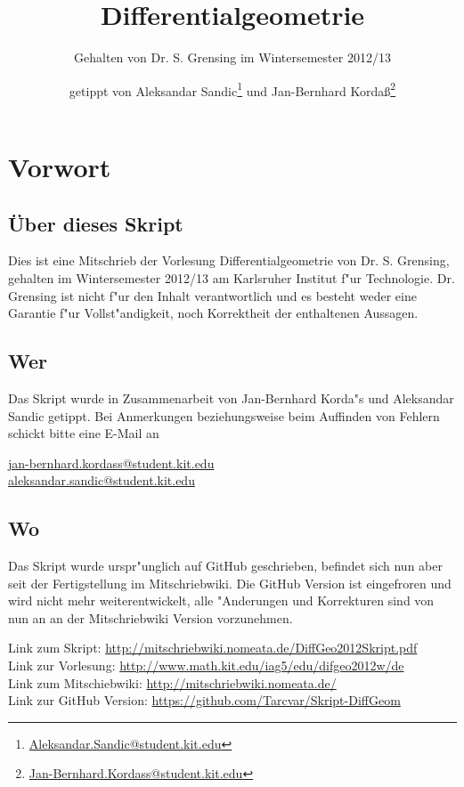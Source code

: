 \documentclass[paper=A4, twoside, chapterprefix=true, bibliography=totoc, headsepline]{scrbook}
\title{Differentialgeometrie}
\subtitle{Gehalten von Dr. S. Grensing im Wintersemester 2012/13}
\author{getippt von Aleksandar Sandic\thanks{\href{mailto:aleksandar.sandic@student.kit.edu}{Aleksandar.Sandic@student.kit.edu}} und Jan-Bernhard Korda\ss\thanks{\href{mailto:jan-bernhard.kordass@student.kit.edu}{Jan-Bernhard.Kordass@student.kit.edu}}}
\theoremstyle{plain}
\theoremstyle{nonumberplain}
\theoremstyle{empty}
\theoremstyle{break}
\newcommand{\quot}[1]{\textrm{\glqq}{#1}\textrm{\grqq}}
\begin{document}
\maketitle

\setlength\parskip{0.6pt}
\tableofcontents

\chapter*{Vorwort}

\section*{\"Uber dieses Skript}
Dies ist eine Mitschrieb der Vorlesung \quot{Differentialgeometrie} von Dr. S. Grensing, gehalten im Wintersemester 2012/13 am Karlsruher Institut f"ur Technologie.
Dr. Grensing ist nicht f"ur den Inhalt verantwortlich und es besteht weder eine Garantie f"ur Vollst"andigkeit, noch Korrektheit der enthaltenen Aussagen.

\section*{Wer}
Das Skript wurde in Zusammenarbeit von Jan-Bernhard Korda"s und Aleksandar Sandic getippt.
Bei Anmerkungen beziehungsweise beim Auffinden von Fehlern schickt bitte eine E-Mail an
\begin{center}
  \href{mailto:jan-bernhard.kordass@student.kit.edu}{jan-bernhard.kordass@student.kit.edu}\\
  \href{mailto:aleksandar.sandic@student.kit.edu}{aleksandar.sandic@student.kit.edu}
\end{center}

\section*{Wo}
Das Skript wurde urspr"unglich auf GitHub geschrieben, befindet sich nun aber seit der Fertigstellung im Mitschriebwiki.
Die GitHub Version ist \quot{eingefroren} und wird nicht mehr weiterentwickelt, alle "Anderungen und Korrekturen sind von nun an an der Mitschriebwiki Version vorzunehmen.

Link zum Skript: \url{http://mitschriebwiki.nomeata.de/DiffGeo2012Skript.pdf}\\
Link zur Vorlesung: \url{http://www.math.kit.edu/iag5/edu/difgeo2012w/de}\\
Link zum Mitschiebwiki: \url{http://mitschriebwiki.nomeata.de/}\\
Link zur GitHub Version: \url{https://github.com/Tarcvar/Skript-DiffGeom}
\end{document}
